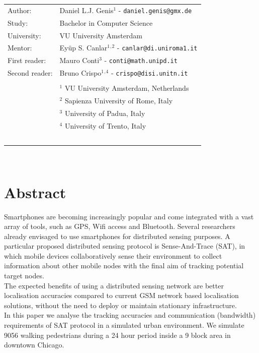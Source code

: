 \documentclass[10pt,titlepage]{article}
\begin{document}
\begin{titlepage}
\begin{adjustwidth}{-2cm}{-2cm}
\begin{center}
 \normalsize{
    \begin{tabular}{ll}
    	Author: & {Daniel L.J. Genis$^1$ - \texttt{daniel.genis@gmx.de}} \\
    	Study: & Bachelor in Computer Science\\
    	University: & VU University Amsterdam\\
	Mentor: & Ey\"up S. Canlar$^1$$^,$$^2$ - \texttt{canlar@di.uniroma1.it}\\
	First reader: & Mauro Conti$^3$ - \texttt{conti@math.unipd.it}\\
	Second reader: & Bruno Crispo$^1$$^,$$^4$ - \texttt{crispo@disi.unitn.it}\\
     & \\
     & $^1$ VU University Amsterdam, Netherlands\\
     & $^2$ Sapienza University of Rome, Italy\\
     & $^3$ University of Padua, Italy\\
     & $^4$ University of Trento, Italy\\\
    

    \end{tabular}\\
        }\end{center}

  \end{adjustwidth}
\end{titlepage}
\clearpage



\section*{Abstract}
\indent Smartphones are becoming increasingly popular and come integrated with a vast array of tools,
such as GPS, Wifi access and Bluetooth. Several researchers already envisaged to use smartphones
for distributed sensing purposes. A particular proposed distributed sensing protocol is Sense-And-Trace (SAT), in which mobile devices collaboratively sense their environment to collect information about other mobile nodes with the final aim of tracking potential target nodes.\\

The expected benefits of using a distributed sensing network are better localisation accuracies compared to current GSM network based localisation solutions, without the need to deploy or maintain stationary infrastructure.\\

In this paper we analyse the tracking accuracies and communication (bandwidth) requirements of SAT protocol in a simulated urban environment. We simulate 9056 walking pedestrians during a 24 hour period inside a 9 block area in downtown Chicago.\\
\end{document}
